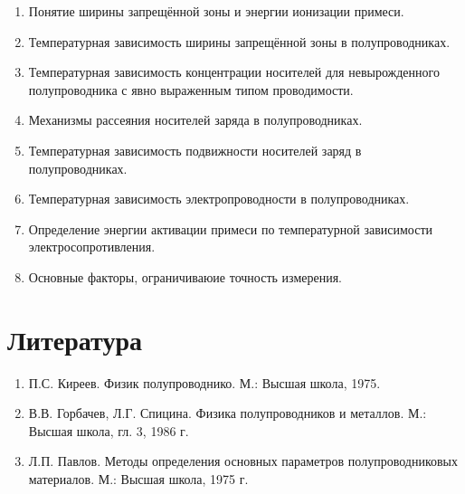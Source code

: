 \begin{enumerate}
\item Понятие ширины запрещённой зоны и энергии ионизации примеси.
\item Температурная зависимость ширины запрещённой зоны в полупроводниках.
\item Температурная зависимость концентрации носителей для невырожденного полупроводника с явно выраженным типом проводимости.
\item Механизмы рассеяния носителей заряда в полупроводниках.
\item Температурная зависимость подвижности носителей заряд в полупроводниках.
\item Температурная зависимость электропроводности в полупроводниках.
\item Определение энергии активации примеси по температурной зависимости электросопротивления.
\item Основные факторы, ограничиваюие точность измерения.
\end{enumerate}

\section{Литература}

\begin{enumerate}
\item П.С. Киреев. Физик полупроводнико. М.: Высшая школа, 1975.
\item В.В. Горбачев, Л.Г. Спицина. Физика полупроводников и металлов. М.: Высшая школа, гл. 3, 1986 г.
\item Л.П. Павлов. Методы определения основных параметров полупроводниковых материалов. М.: Высшая школа, 1975 г.
\end{enumerate}